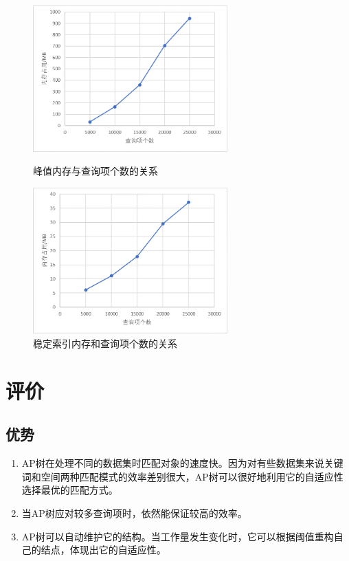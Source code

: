 \documentclass[UTF8]{ctexart}
\begin{document}
\begin{figure}[htbp]
    \centering
    \begin{minipage}[t]{8cm}
        \centering
        \includegraphics[width=7.5cm]{ram_peak.png}
        \caption{峰值内存与查询项个数的关系}
        \label{ram_peak}
    \end{minipage}
    \begin{minipage}[t]{8cm}
        \centering
        \includegraphics[width=7.5cm]{ram_stable.png}
        \caption{稳定索引内存和查询项个数的关系}
        \label{ram_stable}
    \end{minipage}
\end{figure}

\section{评价}
\subsection{优势}
\begin{enumerate}
    \item AP树在处理不同的数据集时匹配对象的速度快。因为对有些数据集来说关键词和空间两种匹配模式的效率差别很大，AP树可以很好地利用它的自适应性选择最优的匹配方式。
    \item 当AP树应对较多查询项时，依然能保证较高的效率。
    \item AP树可以自动维护它的结构。当工作量发生变化时，它可以根据阈值重构自己的结点，体现出它的自适应性。
\end{enumerate}
\end{document}
